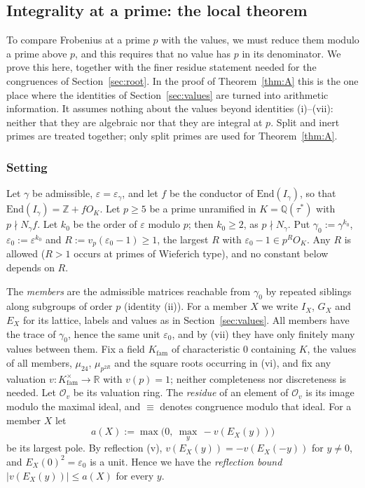 \documentclass[11pt]{amsart}
\numberwithin{equation}{section}
\theoremstyle{plain}
\theoremstyle{definition}
\theoremstyle{remark}
\begin{document}
\subsection{Integrality at a prime: the local theorem}\label{sec:local}

To compare Frobenius at a prime \(p\) with the values, we must reduce them modulo a prime above \(p\), and this requires that no value has \(p\) in its denominator. We prove this here, together with the finer residue statement needed for the congruences of Section~\ref{sec:root}. In the proof of Theorem~\ref{thm:A} this is the one place where the identities of Section~\ref{sec:values} are turned into arithmetic information. It assumes nothing about the values beyond identities (i)--(vii): neither that they are algebraic nor that they are integral at \(p\). Split and inert primes are treated together; only split primes are used for Theorem~\ref{thm:A}.

\subsubsection*{Setting}
Let \(\gamma\) be admissible, \(\varepsilon=\varepsilon_\gamma\), and let \(f\) be the conductor of \(\mathrm{End}(I_\gamma)\), so that \(\mathrm{End}(I_\gamma)=\mathbb Z+fO_K\). Let \(p\ge5\) be a prime unramified in \(K=\mathbb Q(\tau^*)\) with \(p\nmid N_\gamma f\). Let \(k_0\) be the order of \(\varepsilon\) modulo \(p\); then \(k_0\ge2\), as \(p\nmid N_\gamma\). Put \(\gamma_0:=\gamma^{k_0}\), \(\varepsilon_0:=\varepsilon^{k_0}\) and \(R:=v_p(\varepsilon_0-1)\ge1\), the largest \(R\) with \(\varepsilon_0-1\in p^RO_K\). Any \(R\) is allowed (\(R>1\) occurs at primes of Wieferich type), and no constant below depends on \(R\).

The \emph{members} are the admissible matrices reachable from \(\gamma_0\) by repeated siblings along subgroups of order \(p\) (identity (ii)). For a member \(X\) we write \(I_X\), \(G_X\) and \(E_X\) for its lattice, labels and values as in Section~\ref{sec:values}. All members have the trace of \(\gamma_0\), hence the same unit \(\varepsilon_0\), and by (vii) they have only finitely many values between them. Fix a field \(K_{\mathrm{fam}}\) of characteristic \(0\) containing \(K\), the values of all members, \(\mu_{24}\), \(\mu_{p^{2R}}\) and the square roots occurring in (vi), and fix any valuation \(v:K_{\mathrm{fam}}^\times\to\mathbb R\) with \(v(p)=1\); neither completeness nor discreteness is needed. Let \(\mathcal O_v\) be its valuation ring. The \emph{residue} of an element of \(\mathcal O_v\) is its image modulo the maximal ideal, and \(\equiv\) denotes congruence modulo that ideal. For a member \(X\) let
\[a(X):=\max\bigl(0,\ \max_y\,-v(E_X(y))\bigr)\]
be its largest pole. By reflection (v), \(v(E_X(y))=-v(E_X(-y))\) for \(y\ne0\), and \(E_X(0)^2=\varepsilon_0\) is a unit. Hence we have the \emph{reflection bound} \(|v(E_X(y))|\le a(X)\) for every \(y\).
\end{document}
